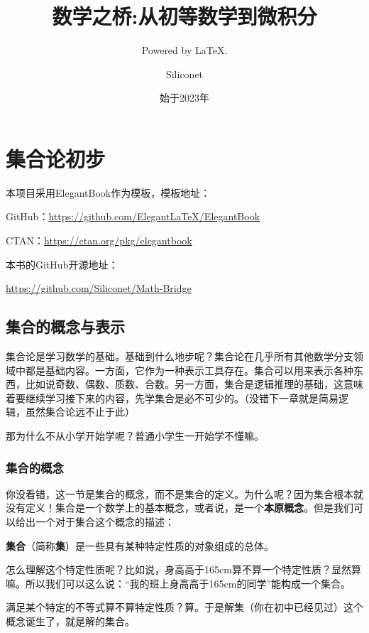\documentclass[lang=cn,math=cm,chinesefont=nofont,11pt,scheme=chinese,onecol]{elegantbook}
\title{数学之桥:从初等数学到微积分}
\subtitle{Powered by \LaTeX.}
\author{Siliconet}
\date{始于2023年}
\begin{document}
\maketitle
\frontmatter

\tableofcontents

\mainmatter

\chapter{集合论初步}

本项目采用ElegantBook作为模板，模板地址：

GitHub：\href{https://github.com/ElegantLaTeX/ElegantBook}{https://github.com/ElegantLaTeX/ElegantBook}

CTAN：\href{https://ctan.org/pkg/elegantbook}{https://ctan.org/pkg/elegantbook}

本书的GitHub开源地址：

\href{https://github.com/Siliconet/Math-Bridge}{https://github.com/Siliconet/Math-Bridge}

\section{集合的概念与表示}
集合论是学习数学的基础。基础到什么地步呢？集合论在几乎所有其他数学分支领域中都是基础内容。一方面，它作为一种表示工具存在。集合可以用来表示各种东西，比如说奇数、偶数、质数、合数。另一方面，集合是逻辑推理的基础，这意味着要继续学习接下来的内容，先学集合是必不可少的。（没错下一章就是简易逻辑，虽然集合论远不止于此）

那为什么不从小学开始学呢？普通小学生一开始学不懂嘛。

\subsection{集合的概念}

你没看错，这一节是集合的概念，而不是集合的定义。为什么呢？因为集合根本就没有定义！集合是一个数学上的基本概念，或者说，是一个\textbf{本原概念}。但是我们可以给出一个对于集合这个概念的描述：


\textbf{集合}（简称\textbf{集}）是一些具有某种特定性质的对象组成的总体。

怎么理解这个特定性质呢？比如说，身高高于165cm算不算一个特定性质？显然算嘛。所以我们可以这么说：“我的班上身高高于165cm的同学”能构成一个集合。

满足某个特定的不等式算不算特定性质？算。于是解集（你在初中已经见过）这个概念诞生了，就是解的集合。
\end{document}
